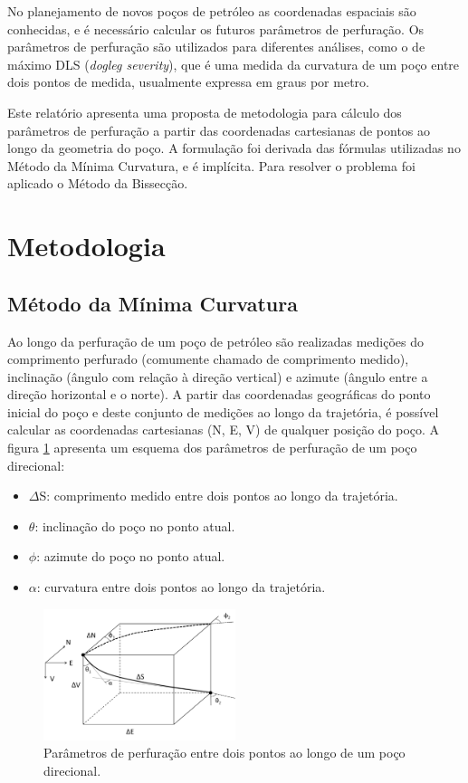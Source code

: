 \documentclass[final,3p,12pt]{elsarticle}
\begin{document}
No planejamento de novos poços de petróleo as coordenadas espaciais são conhecidas, e é necessário calcular os futuros parâmetros de perfuração. Os parâmetros de perfuração são utilizados para diferentes análises, como o de máximo DLS (\emph{dogleg severity}), que é uma medida da curvatura de um poço entre dois pontos de medida, usualmente expressa em graus por metro.

Este relatório apresenta uma proposta de metodologia para cálculo dos parâmetros de perfuração a partir das coordenadas cartesianas de pontos ao longo da geometria do poço. A formulação foi derivada das fórmulas utilizadas no Método da Mínima Curvatura, e é implícita. Para resolver o problema foi aplicado o Método da Bissecção.

\section{Metodologia}

\subsection{Método da Mínima Curvatura}

Ao longo da perfuração de um poço de petróleo são realizadas medições do comprimento perfurado (comumente chamado de comprimento medido), inclinação (ângulo com relação à direção vertical) e azimute (ângulo entre a direção horizontal e o norte). A partir das coordenadas geográficas do ponto inicial do poço e deste conjunto de medições ao longo da trajetória, é possível calcular as coordenadas cartesianas (N, E, V) de qualquer posição do poço. A figura \ref{fig:parametros} apresenta um esquema dos parâmetros de perfuração de um poço direcional:
\begin{itemize}
    \item $\Delta$S: comprimento medido entre dois pontos ao longo da trajetória.
    \item $\theta$: inclinação do poço no ponto atual.
    \item $\phi$: azimute do poço no ponto atual.
    \item $\alpha$: curvatura entre dois pontos ao longo da trajetória.
\end{itemize}

\begin{figure}[h]
    \centering
    \includegraphics[width=0.5\textwidth]{Parametros}
    \caption{Parâmetros de perfuração entre dois pontos ao longo de um poço direcional.}
    \label{fig:parametros}
\end{figure}
\end{document}
